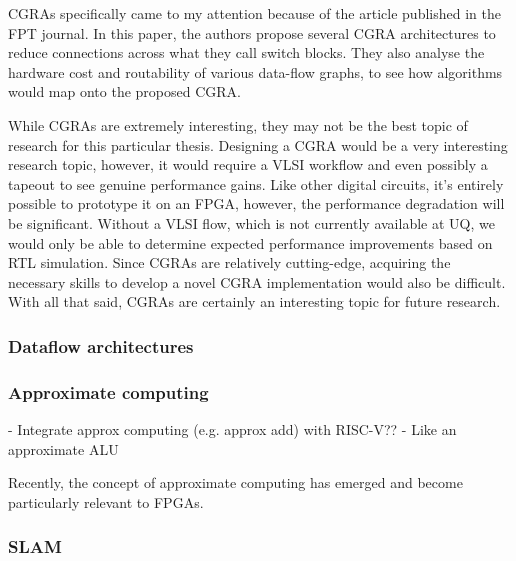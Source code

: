 \documentclass[12pt]{article}
\begin{document}
CGRAs specifically came to my attention because of the article \cite{Boma2022} published in the FPT journal.
In this paper, the authors propose several CGRA architectures to reduce connections across what they call
switch blocks. They also analyse the hardware cost and routability of various data-flow graphs, to see how
algorithms would map onto the proposed CGRA. 

While CGRAs are extremely interesting, they may not be the best topic of research for this particular thesis.
Designing a CGRA would be a very interesting research topic, however, it would require a VLSI workflow and even
possibly a tapeout to see genuine performance gains. Like other digital circuits, it's entirely possible to
prototype it on an FPGA, however, the performance degradation will be significant. Without a VLSI flow, which
is not currently available at UQ, we would only be able to determine expected performance improvements based
on RTL simulation. Since CGRAs are relatively cutting-edge, acquiring the necessary skills to develop a novel
CGRA implementation would also be difficult. With all that said, CGRAs are certainly an interesting topic for
future research.

\subsubsection{Dataflow architectures}

\subsubsection{Approximate computing}

- Integrate approx computing (e.g. approx add) with RISC-V??
- Like an approximate ALU

Recently, the concept of approximate computing has emerged and become particularly relevant to FPGAs.

\subsubsection{SLAM}
\end{document}
